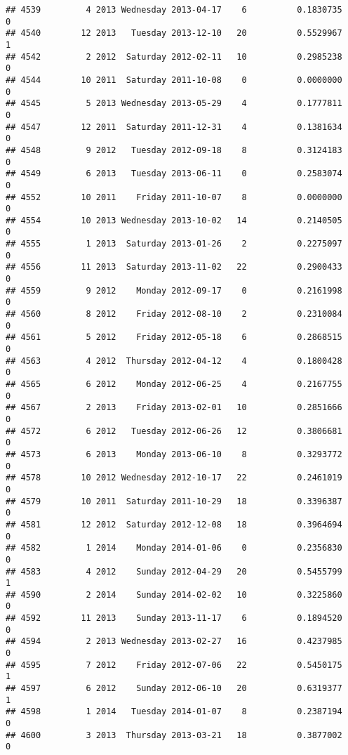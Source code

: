 \documentclass[
]{article}
\begin{document}
\begin{verbatim}
## 4539         4 2013 Wednesday 2013-04-17    6          0.1830735             0
## 4540        12 2013   Tuesday 2013-12-10   20          0.5529967             1
## 4542         2 2012  Saturday 2012-02-11   10          0.2985238             0
## 4544        10 2011  Saturday 2011-10-08    0          0.0000000             0
## 4545         5 2013 Wednesday 2013-05-29    4          0.1777811             0
## 4547        12 2011  Saturday 2011-12-31    4          0.1381634             0
## 4548         9 2012   Tuesday 2012-09-18    8          0.3124183             0
## 4549         6 2013   Tuesday 2013-06-11    0          0.2583074             0
## 4552        10 2011    Friday 2011-10-07    8          0.0000000             0
## 4554        10 2013 Wednesday 2013-10-02   14          0.2140505             0
## 4555         1 2013  Saturday 2013-01-26    2          0.2275097             0
## 4556        11 2013  Saturday 2013-11-02   22          0.2900433             0
## 4559         9 2012    Monday 2012-09-17    0          0.2161998             0
## 4560         8 2012    Friday 2012-08-10    2          0.2310084             0
## 4561         5 2012    Friday 2012-05-18    6          0.2868515             0
## 4563         4 2012  Thursday 2012-04-12    4          0.1800428             0
## 4565         6 2012    Monday 2012-06-25    4          0.2167755             0
## 4567         2 2013    Friday 2013-02-01   10          0.2851666             0
## 4572         6 2012   Tuesday 2012-06-26   12          0.3806681             0
## 4573         6 2013    Monday 2013-06-10    8          0.3293772             0
## 4578        10 2012 Wednesday 2012-10-17   22          0.2461019             0
## 4579        10 2011  Saturday 2011-10-29   18          0.3396387             0
## 4581        12 2012  Saturday 2012-12-08   18          0.3964694             0
## 4582         1 2014    Monday 2014-01-06    0          0.2356830             0
## 4583         4 2012    Sunday 2012-04-29   20          0.5455799             1
## 4590         2 2014    Sunday 2014-02-02   10          0.3225860             0
## 4592        11 2013    Sunday 2013-11-17    6          0.1894520             0
## 4594         2 2013 Wednesday 2013-02-27   16          0.4237985             0
## 4595         7 2012    Friday 2012-07-06   22          0.5450175             1
## 4597         6 2012    Sunday 2012-06-10   20          0.6319377             1
## 4598         1 2014   Tuesday 2014-01-07    8          0.2387194             0
## 4600         3 2013  Thursday 2013-03-21   18          0.3877002             0

\end{verbatim}
\end{document}
